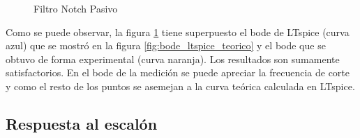 \documentclass[12pt,a4paper]{article}
\begin{document}
\begin{figure}[H] 
\begin{center}
\caption{Filtro Notch Pasivo}
\label{fig:superpuesto}
\end{center}
\end{figure}


Como se puede observar, la figura \ref{fig:superpuesto} tiene superpuesto el bode
de LTspice (curva azul) que se mostró en la figura \ref{fig:bode_ltspice_teorico} y el bode que se obtuvo de forma experimental (curva naranja). Los resultados son sumamente satisfactorios. En el bode de la medición se puede apreciar la frecuencia de corte y como el resto de los puntos se asemejan a la curva teórica calculada en LTspice. 


\subsection{Respuesta al escalón}
\end{document}
